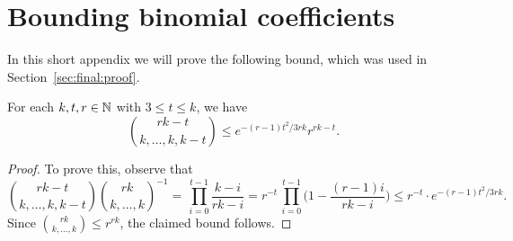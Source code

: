\section{Bounding binomial coefficients}\label{app:binomial}

In this short appendix we will prove the following bound, which was used in Section~\ref{sec:final:proof}. 

\begin{lemma}\label{lem:multibounds}
For each $k,t,r \in \mathbb{N}$ with $3 \le t \le k$, we have
$$\binom{rk-t}{k,\dots,k,k-t} \le e^{-(r-1)t^2/3rk} r^{rk-t}.$$
\end{lemma}
 
\begin{proof}
To prove this, observe that 
$$\binom{rk-t}{k,\dots,k,k-t} \binom{rk}{k,\dots,k}^{-1} = \, \prod_{i = 0}^{t - 1} \frac{k - i}{rk - i} = r^{-t} \,\prod_{i = 0}^{t-1} \bigg( 1 - \frac{(r-1)i}{rk - i} \bigg) \le r^{-t} \cdot e^{-(r-1)t^2/3rk}.$$
Since $\binom{rk}{k,\dots,k} \le r^{rk}$, the claimed bound follows.
\end{proof}

